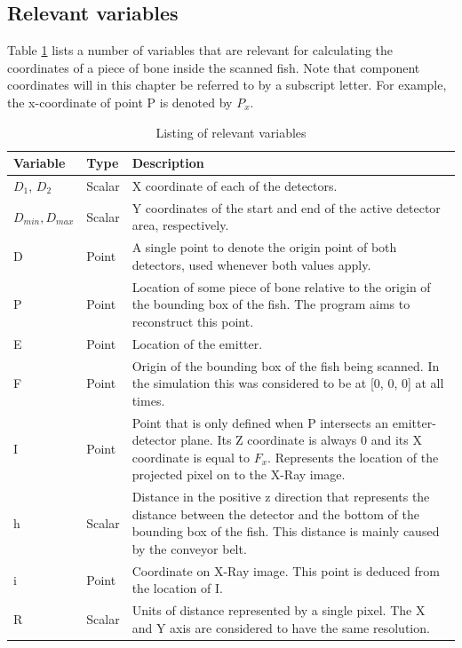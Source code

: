 \subsection{Relevant variables}
Table \ref{table:imageProcessingVariables} lists a number of variables that are relevant for calculating the coordinates of a piece of bone inside the scanned fish. Note that component coordinates will in this chapter be referred to by a subscript letter. For example, the x-coordinate of point P is denoted by $P_x$.

\begin{table}[hpt!]
\begin{tabular}{ |p{2cm}|p{1.1cm}|p{12cm}| } 
 \hline
	\textbf{Variable} & \textbf{Type} & \textbf{Description} \\ 
\hline
	$D_1$, $D_2$ & Scalar & X coordinate of each of the detectors. \\ 
	\hline
	$D_{min}, D_{max}$ & Scalar & Y coordinates of the start and end of the active detector area, respectively. \\
	\hline
	D & Point & A single point to denote the origin point of both detectors, used whenever both values apply. \\
	\hline
	P & Point & Location of some piece of bone relative to the origin of the bounding box of the fish. The program aims to reconstruct this point. \\
	\hline
	E & Point & Location of the emitter.\\
	\hline
	F & Point & Origin of the bounding box of the fish being scanned. In the simulation this was considered to be at [0, 0, 0] at all times.\\
	\hline
	I & Point & Point that is only defined when P intersects an emitter-detector plane. Its Z coordinate is always 0 and its X coordinate is equal to $F_x$. Represents the location of the projected pixel on to the X-Ray image.\\
	\hline
	h & Scalar & Distance in the positive z direction that represents the distance between the detector and the bottom of the bounding box of the fish. This distance is mainly caused by the conveyor belt.\\
	\hline
	i & Point & Coordinate on X-Ray image. This point is deduced from the location of I. \\
	\hline
	R & Scalar & Units of distance represented by a single pixel. The X and Y axis are considered to have the same resolution. \\
\hline
\end{tabular}
\caption{Listing of relevant variables}
\label{table:imageProcessingVariables}
\end{table}

